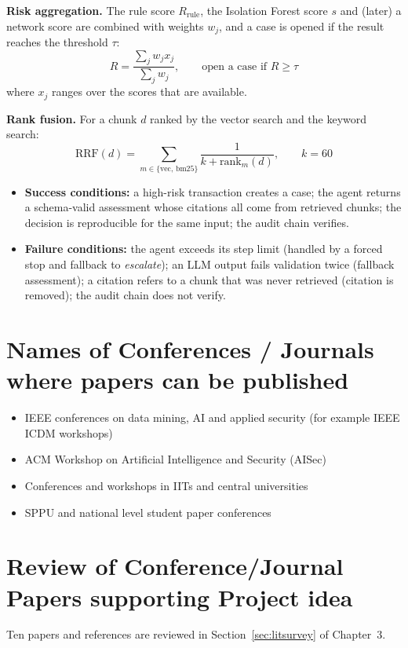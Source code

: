 \documentclass[oneside,a4paper,12pt]{report}
\begin{document}
\textbf{Risk aggregation.} The rule score $R_{\mathrm{rule}}$, the Isolation Forest score $s$ and (later) a network score are combined with weights $w_j$, and a case is opened if the result reaches the threshold $\tau$:
\begin{equation}
  R = \frac{\sum_{j} w_j x_j}{\sum_{j} w_j}, \qquad \text{open a case if } R \ge \tau
\end{equation}
where $x_j$ ranges over the scores that are available.

\textbf{Rank fusion.} For a chunk $d$ ranked by the vector search and the keyword search:
\begin{equation}
  \mathrm{RRF}(d) = \sum_{m \in \{\mathrm{vec},\,\mathrm{bm25}\}} \frac{1}{k + \mathrm{rank}_m(d)}, \qquad k = 60
\end{equation}

\begin{itemize}[leftmargin=*]
  \item \textbf{Success conditions:} a high-risk transaction creates a case; the agent returns a schema-valid assessment whose citations all come from retrieved chunks; the decision is reproducible for the same input; the audit chain verifies.
  \item \textbf{Failure conditions:} the agent exceeds its step limit (handled by a forced stop and fallback to \emph{escalate}); an LLM output fails validation twice (fallback assessment); a citation refers to a chunk that was never retrieved (citation is removed); the audit chain does not verify.
\end{itemize}

\section{Names of Conferences / Journals where papers can be published}
\begin{itemize}
  \item IEEE conferences on data mining, AI and applied security (for example IEEE ICDM workshops)
  \item ACM Workshop on Artificial Intelligence and Security (AISec)
  \item Conferences and workshops in IITs and central universities
  \item SPPU and national level student paper conferences
\end{itemize}

\section{Review of Conference/Journal Papers supporting Project idea}
\label{sec:survey}
Ten papers and references are reviewed in Section~\ref{sec:litsurvey} of Chapter~3.
\end{document}
